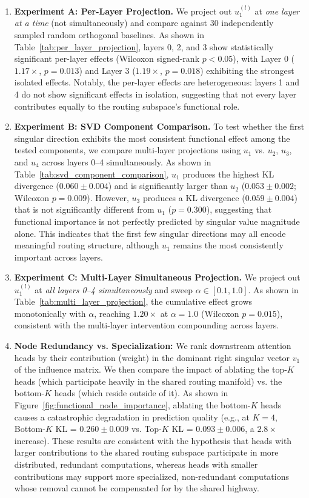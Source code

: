 \documentclass[11pt,a4paper]{article}
\theoremstyle{definition}
\theoremstyle{plain}
\begin{document}
\begin{enumerate}
    \item \textbf{Experiment A: Per-Layer Projection.} We project out $u_1^{(l)}$ at \emph{one layer at a time} (not simultaneously) and compare against 30 independently sampled random orthogonal baselines. As shown in Table~\ref{tab:per_layer_projection}, layers 0, 2, and 3 show statistically significant per-layer effects (Wilcoxon signed-rank $p < 0.05$), with Layer 0 ($1.17\times$, $p=0.013$) and Layer 3 ($1.19\times$, $p=0.018$) exhibiting the strongest isolated effects. Notably, the per-layer effects are heterogeneous: layers 1 and 4 do not show significant effects in isolation, suggesting that not every layer contributes equally to the routing subspace's functional role.

    \item \textbf{Experiment B: SVD Component Comparison.} To test whether the first singular direction exhibits the most consistent functional effect among the tested components, we compare multi-layer projections using $u_1$ vs. $u_2$, $u_3$, and $u_4$ across layers 0--4 simultaneously. As shown in Table~\ref{tab:svd_component_comparison}, $u_1$ produces the highest KL divergence ($0.060 \pm 0.004$) and is significantly larger than $u_2$ ($0.053 \pm 0.002$; Wilcoxon $p = 0.009$). However, $u_3$ produces a KL divergence ($0.059 \pm 0.004$) that is not significantly different from $u_1$ ($p = 0.300$), suggesting that functional importance is not perfectly predicted by singular value magnitude alone. This indicates that the first few singular directions may all encode meaningful routing structure, although $u_1$ remains the most consistently important across layers.

    \item \textbf{Experiment C: Multi-Layer Simultaneous Projection.} We project out $u_1^{(l)}$ at \emph{all layers 0--4 simultaneously} and sweep $\alpha \in [0.1, 1.0]$. As shown in Table~\ref{tab:multi_layer_projection}, the cumulative effect grows monotonically with $\alpha$, reaching $1.20\times$ at $\alpha = 1.0$ (Wilcoxon $p = 0.015$), consistent with the multi-layer intervention compounding across layers.

    \item \textbf{Node Redundancy vs. Specialization:} We rank downstream attention heads by their contribution (weight) in the dominant right singular vector $v_1$ of the influence matrix. We then compare the impact of ablating the top-$K$ heads (which participate heavily in the shared routing manifold) vs. the bottom-$K$ heads (which reside outside of it). As shown in Figure~\ref{fig:functional_node_importance}, ablating the bottom-$K$ heads causes a catastrophic degradation in prediction quality (e.g., at $K=4$, Bottom-$K$ KL = $0.260 \pm 0.009$ vs. Top-$K$ KL = $0.093 \pm 0.006$, a $2.8\times$ increase). These results are consistent with the hypothesis that heads with larger contributions to the shared routing subspace participate in more distributed, redundant computations, whereas heads with smaller contributions may support more specialized, non-redundant computations whose removal cannot be compensated for by the shared highway.
\end{enumerate}
\end{document}
